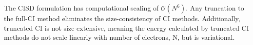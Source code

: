       The CISD formulation has computational scaling of $\mathcal{O}(N^6)$.  Any truncation to the full-CI method eliminates the size-consistency of CI methods.  Additionally, truncated CI is not size-extensive, meaning the energy calculated by truncated CI methods do not scale linearly with number of electrons, N, but is variational.


